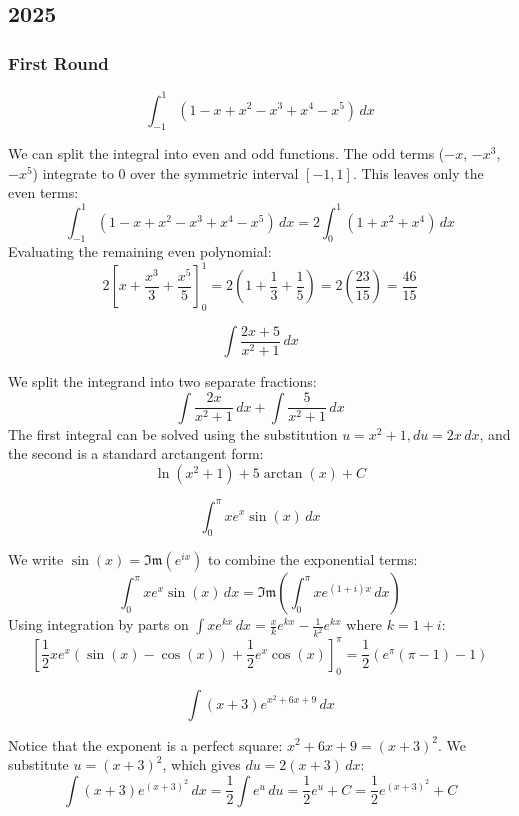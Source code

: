 \subsection*{2025}

\subsubsection*{First Round}

\begin{questions}

\question
\[ \int_{-1}^{1} (1-x+x^{2}-x^{3}+x^{4}-x^{5}) \, dx \]
\begin{solution}
We can split the integral into even and odd functions. The odd terms ($-x$, $-x^3$, $-x^5$) integrate to $0$ over the symmetric interval $[-1, 1]$. This leaves only the even terms:
\[ \int_{-1}^{1} (1-x+x^{2}-x^{3}+x^{4}-x^{5}) \, dx = 2\int_{0}^{1} (1+x^{2}+x^{4}) \, dx \]
Evaluating the remaining even polynomial:
\[ 2 \left[ x + \frac{x^{3}}{3} + \frac{x^{5}}{5} \right]_{0}^{1} = 2 \left( 1 + \frac{1}{3} + \frac{1}{5} \right) = 2 \left( \frac{23}{15} \right) = \frac{46}{15} \]
\end{solution}

\question
\[ \int \frac{2x+5}{x^{2}+1} \, dx \]
\begin{solution}
We split the integrand into two separate fractions:
\[ \int \frac{2x}{x^{2}+1} \, dx + \int \frac{5}{x^{2}+1} \, dx \]
The first integral can be solved using the substitution $u = x^2+1, du = 2x\,dx$, and the second is a standard arctangent form:
\[ \ln(x^{2}+1) + 5\arctan(x) + C \]
\end{solution}

\question
\[ \int_{0}^{\pi} xe^{x}\sin(x) \, dx \]
\begin{solution}
We write $\sin(x) = \mathfrak{Im}(e^{ix})$ to combine the exponential terms:
\[ \int_{0}^{\pi} xe^{x}\sin(x) \, dx = \mathfrak{Im} \left( \int_{0}^{\pi} x e^{(1+i)x} \, dx \right) \]
Using integration by parts on $\int x e^{kx} \, dx = \frac{x}{k}e^{kx} - \frac{1}{k^2}e^{kx}$ where $k = 1+i$:
\[ \left[ \frac{1}{2}xe^{x}(\sin(x)-\cos(x)) + \frac{1}{2}e^{x}\cos(x) \right]_{0}^{\pi} = \frac{1}{2}\left(e^{\pi}(\pi - 1) - 1\right) \]
\end{solution}

\question
\[ \int (x+3)e^{x^{2}+6x+9} \, dx \]
\begin{solution}
Notice that the exponent is a perfect square: $x^2+6x+9 = (x+3)^2$. We substitute $u = (x+3)^2$, which gives $du = 2(x+3) \, dx$:
\[ \int (x+3)e^{(x+3)^2} \, dx = \frac{1}{2}\int e^{u} \, du = \frac{1}{2}e^{u} + C = \frac{1}{2}e^{(x+3)^{2}} + C \]
\end{solution}


\end{questions}
